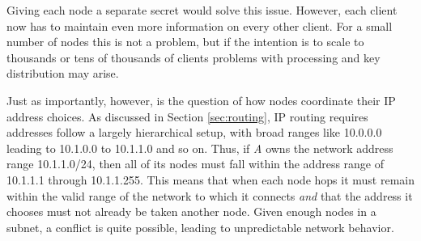 \par Giving each node a separate secret would solve this issue. However, each client now has to maintain even more information on every other client. For a small number of nodes this is not a problem, but if the intention is to scale to thousands or tens of thousands of clients problems with processing and key distribution may arise.  

\par Just as importantly, however, is the question of how nodes coordinate their IP address choices. As discussed in Section \ref{sec:routing}, IP routing requires addresses follow a largely hierarchical setup, with broad ranges like 10.0.0.0 leading to 10.1.0.0 to 10.1.1.0 and so on. Thus, if \textit{A} owns the network address range 10.1.1.0/24, then all of its nodes must fall within the address range of 10.1.1.1 through 10.1.1.255. This means that when each node hops it must remain within the valid range of the network to which it connects \textit{and} that the address it chooses must not already be taken another node. Given enough nodes in a subnet, a conflict is quite possible, leading to unpredictable network behavior. 



